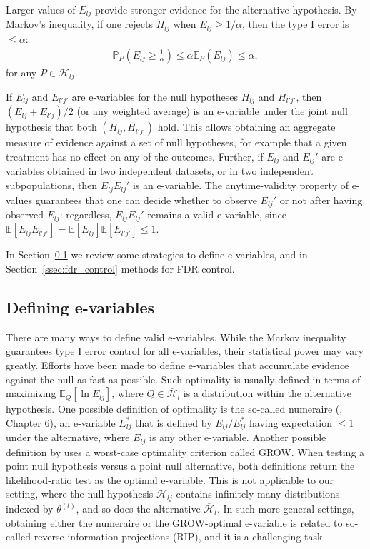 \documentclass[pdflatex,sn-mathphys-num]{sn-jnl}%
\theoremstyle{thmstyleone}%
\theoremstyle{thmstyletwo}%
\theoremstyle{thmstylethree}%
\begin{document}
Larger values of $E_{lj}$ provide stronger evidence for the alternative hypothesis.
By Markov's inequality, if one rejects $H_{lj}$ when $E_{lj} \geq 1/\alpha$, then the type I error is $\leq \alpha$:
\begin{align}
 \mathbb P_P \left( E_{lj} \geq \frac{1}{\alpha} \right) \leq \alpha \mathbb E_P(E_{lj}) \leq \alpha,
\nonumber
\end{align}
for any $P \in \mathcal{H}_{lj}$.

\color{blue}
If $E_{lj}$ and $E_{l'j'}$ are e-variables for the null hypotheses $H_{lj}$ and $H_{l'j'}$, then $(E_{lj} + E_{l'j})/2$ (or any weighted average) is an e-variable under the joint null hypothesis that both $(H_{lj}, H_{l'j'})$ hold. This allows obtaining an aggregate measure of evidence against a set of null hypotheses, for example that a given treatment has no effect on any of the outcomes.
Further, if $E_{lj}$ and $E_{lj}'$ are e-variables obtained in two independent datasets, or in two independent subpopulations, then $E_{lj} E_{lj}'$ is an e-variable. The anytime-validity property of e-values guarantees that one can decide whether to observe $E_{lj}'$ or not after having observed $E_{lj}$: regardless, $E_{lj} E_{lj}'$ remains a valid e-variable, since $\mathbb E [E_{lj} E_{l'j'}] = \mathbb E[ E_{lj} ] \mathbb E [E_{l'j'}] \leq 1$.

\color{black}

In Section~\ref{ssec:define_evariables} we review some strategies to define e-variables,
and in Section~\ref{ssec:fdr_control} methods for FDR control.



\subsection{Defining e-variables}
\label{ssec:define_evariables}

There are many ways to define valid e-variables. While the Markov inequality guarantees type I error control for all e-variables, their statistical power may vary greatly. Efforts have been made to define e-variables that accumulate evidence against the null as fast as possible. Such optimality is usually defined in terms of maximizing $\mathbb E_Q [\ln E_{lj}]$, where $Q \in \overline{\mathcal{H}}_l$ is a distribution within the alternative hypothesis. 
One possible definition of optimality is the so-called numeraire (\cite{ramdas:2025}, Chapter 6), an e-variable $E_{lj}^*$ that is defined by $E_{lj}/E_{lj}^*$ having expectation $\leq 1$ under the alternative, where $E_{lj}$ is any other e-variable. 
Another possible definition by \cite{gruenwald:2024} uses a worst-case optimality criterion called GROW.
When testing a point null hypothesis versus a point null alternative, both definitions return the likelihood-ratio test as the optimal e-variable. This is not applicable to our setting, where the null hypothesis $\mathcal{H}_{lj}$ contains infinitely many distributions indexed by $\theta^{(l)}$, and so does the alternative $\overline{\mathcal{H}}_l$.
In such more general settings, obtaining either the numeraire or the GROW-optimal e-variable is related to so-called reverse information projections (RIP), and it is a challenging task.
\end{document}
